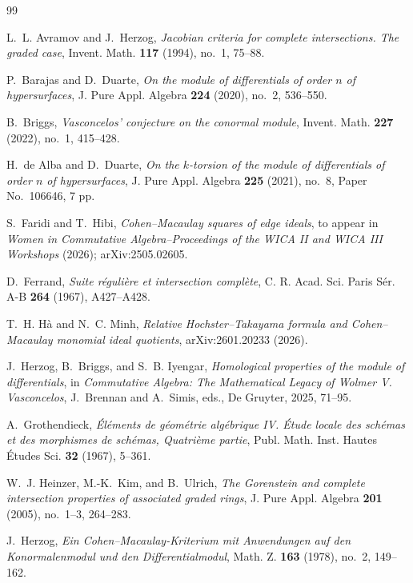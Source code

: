 \documentclass[12pt]{amsart}
\theoremstyle{plain}
\theoremstyle{definition}
\theoremstyle{remark}
\begin{document}
\begin{thebibliography}{99}

L.~L. Avramov and J.~Herzog,
\emph{Jacobian criteria for complete intersections. The graded case},
Invent. Math. \textbf{117} (1994), no.~1, 75--88.

P.~Barajas and D.~Duarte,
\emph{On the module of differentials of order $n$ of hypersurfaces},
J. Pure Appl. Algebra \textbf{224} (2020), no.~2, 536--550.

B.~Briggs,
\emph{Vasconcelos' conjecture on the conormal module},
Invent. Math. \textbf{227} (2022), no.~1, 415--428.

H.~de Alba and D.~Duarte,
\emph{On the $k$-torsion of the module of differentials of order $n$ of hypersurfaces},
J. Pure Appl. Algebra \textbf{225} (2021), no.~8, Paper No.~106646, 7 pp.

S.~Faridi and T.~Hibi,
\emph{Cohen--Macaulay squares of edge ideals},
to appear in \emph{Women in Commutative Algebra--Proceedings of the WICA II and WICA III Workshops} (2026); arXiv:2505.02605.

D.~Ferrand,
\emph{Suite r\'eguli\`ere et intersection compl\`ete},
C. R. Acad. Sci. Paris S\'er. A-B \textbf{264} (1967), A427--A428.

T.~H. H\`a and N.~C. Minh,
\emph{Relative Hochster--Takayama formula and Cohen--Macaulay monomial ideal quotients},
arXiv:2601.20233 (2026).

J.~Herzog, B.~Briggs, and S.~B. Iyengar,
\emph{Homological properties of the module of differentials},
in \emph{Commutative Algebra: The Mathematical Legacy of Wolmer V. Vasconcelos},
J.~Brennan and A.~Simis, eds.,
De Gruyter, 2025, 71--95.

A.~Grothendieck,
\emph{\'El\'ements de g\'eom\'etrie alg\'ebrique IV. \'Etude locale des sch\'emas et des morphismes de sch\'emas, Quatri\`eme partie},
Publ. Math. Inst. Hautes \'Etudes Sci. \textbf{32} (1967), 5--361.

W.~J. Heinzer, M.-K.~Kim, and B.~Ulrich,
\emph{The Gorenstein and complete intersection properties of associated graded rings},
J. Pure Appl. Algebra \textbf{201} (2005), no.~1--3, 264--283.

J.~Herzog,
\emph{Ein Cohen--Macaulay-Kriterium mit Anwendungen auf den Konormalenmodul und den Differentialmodul},
Math. Z. \textbf{163} (1978), no.~2, 149--162.


\end{thebibliography}
\end{document}
